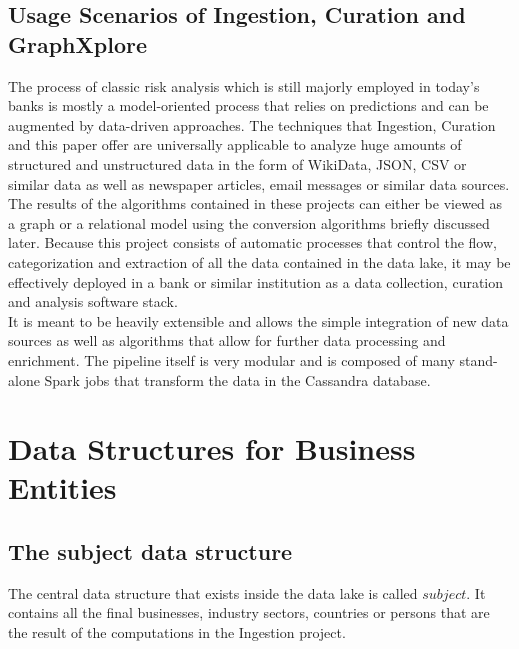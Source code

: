 \documentclass[
        a4paper,     %
        titlepage,   %
        oneside,     %
        parskip      %
]{scrartcl}          %
\begin{document}
    \subsection{Usage Scenarios of Ingestion, Curation and GraphXplore}
    The process of classic risk analysis which is still majorly employed in today's banks is mostly
    a model-oriented process that relies on predictions and can be augmented by data-driven approaches.
    The techniques that Ingestion, Curation and this paper offer are universally
    applicable to analyze huge amounts of structured and unstructured data
    in the form of WikiData, JSON, CSV or similar data as well as newspaper articles,
    email messages or similar data sources.\\
    The results of the algorithms contained in these projects can either be viewed as a graph or a relational model
    using the conversion algorithms briefly discussed later.
    Because this project consists of automatic processes
    that control the flow, categorization and extraction
    of all the data contained in the data lake, it may be effectively deployed in a bank
    or similar institution as a data collection, curation and analysis software stack.\\
    It is meant to be heavily extensible and allows the simple integration of new data sources %
    as well as algorithms that allow for further data processing and enrichment.
    The pipeline itself is very modular and is composed of many stand-alone
    Spark jobs that transform the data in the Cassandra database.

  \section{Data Structures for Business Entities}
    \subsection{The subject data structure}
    \label{sec:subject_structure}
    The central data structure that exists inside the data lake is called $subject$.
    It contains all the final businesses, industry sectors, countries or persons
    that are the result of the computations in the Ingestion project.\\
\end{document}
